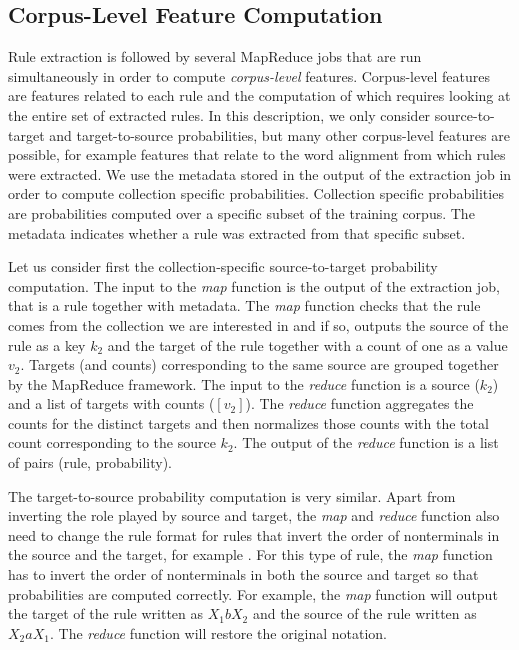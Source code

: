 \subsection{Corpus-Level Feature Computation}
Rule extraction is followed by several MapReduce jobs that are run simultaneously
in order to
compute \emph{corpus-level} features. Corpus-level features
are features related
to each rule and the computation of which requires looking at the entire set of
extracted rules. In this description, we only consider source-to-target and
target-to-source probabilities, but many other corpus-level features are possible,
for example features that relate to the word alignment from which rules were
extracted. We use the metadata stored in the output of the
extraction job in order to compute collection specific probabilities.
Collection specific probabilities are probabilities computed over a specific subset
of the training corpus. The metadata indicates whether a rule was extracted from
that specific subset.

Let us
consider first the collection-specific source-to-target probability computation.
The input to the \emph{map} function
is the output of the extraction job, that is a rule together with metadata.
The \emph{map} function checks that the rule comes from the collection we are
interested in and if so, outputs the source of the rule as a key $k_2$ and the
target of the rule together with a count of one as a value $v_2$. Targets (and
counts) corresponding to the same source are grouped together by the MapReduce
framework. The input to the \emph{reduce} function is a source ($k_2$) and
a list of targets with counts ($[v_2]$). The \emph{reduce} function aggregates
the counts for the distinct targets and then normalizes those counts with the
total count corresponding to the source $k_2$. The output of the \emph{reduce}
function is a list of pairs (rule, probability).

The target-to-source probability computation is very similar. Apart from
inverting the role played by source and target, the \emph{map} and \emph{reduce}
function also need to change the rule format for
rules that invert the order of nonterminals in the source
and the target, for example \RT[$X$][$X_1 a X_2$][$X_2 b X_1$].
For this
type of rule, the \emph{map} function has to invert the order of nonterminals
in both the source and target so that probabilities are computed correctly. For
example, the \emph{map} function will output the target of the rule
written as $X_1 b X_2$ and the source of the rule
written as $X_2 a X_1$. The \emph{reduce} function
will restore the original notation.

